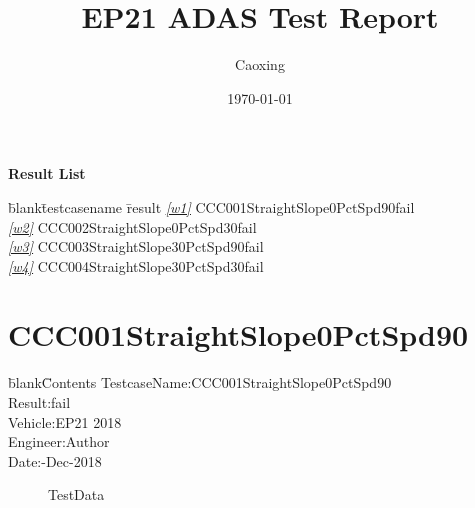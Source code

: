 \documentclass[12pt]{report}
\title{EP21 ADAS Test Report}
\author{Caoxing}
\date{\today}
\begin{document}
 
\maketitle 
\centerline{\Large{\textbf{Result List}}} 
\begin{CJK}{GBK}{kai} 
\begin{tabbing} 
\hspace*{30bp}\=blank\hspace*{30bp}\=testcasename\hspace*{200bp} \=result\kill 
\>\textit{\underline{\ref{w1}}} \>CCC001StraightSlope0PctSpd90\>\textcolor[rgb]{1,0,0}{fail}\\ 
\>\textit{\underline{\ref{w2}}} \>CCC002StraightSlope0PctSpd30\>\textcolor[rgb]{1,0,0}{fail}\\ 
\>\textit{\underline{\ref{w3}}} \>CCC003StraightSlope30PctSpd90\>\textcolor[rgb]{1,0,0}{fail}\\ 
\>\textit{\underline{\ref{w4}}} \>CCC004StraightSlope30PctSpd30\>\textcolor[rgb]{1,0,0}{fail}\\ 
\end{tabbing} 
\end{CJK} 
\newpage 
\section{CCC001StraightSlope0PctSpd90} 
\begin{CJK}{GBK}{kai} 
\begin{tabbing} 
\hspace*{40bp}\=blank\hspace*{80bp}\=Contents\kill 
 \>TestcaseName:\>CCC001StraightSlope0PctSpd90\\ 
 \>Result:\>fail\\ 
 \>Vehicle:\>EP21 2018\\ 
 \>Engineer:\>Author\\ 
 \>Date:-Dec-2018\\ 
\end{tabbing} 
\end{CJK} 
\label{w1} 
\begin{figure}[h!]  
\centering  
{} 
 
\caption{TestData} 
\end{figure} 
\newpage 
\end{document}
